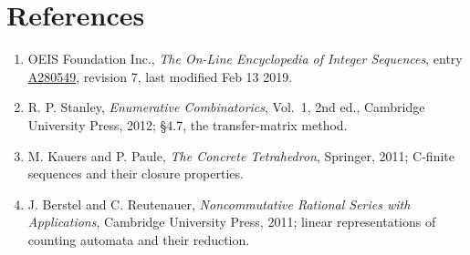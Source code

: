 \documentclass[11pt]{article}
\theoremstyle{definition}
\begin{document}
\section{References}

\begin{enumerate}

\item OEIS Foundation Inc., \emph{The On-Line Encyclopedia of Integer Sequences}, entry \href{https://oeis.org/A280549}{A280549}, revision 7, last modified Feb 13 2019.

\item R. P. Stanley, \emph{Enumerative Combinatorics}, Vol.~1, 2nd ed., Cambridge University Press, 2012; \S4.7, the transfer-matrix method.

\item M. Kauers and P. Paule, \emph{The Concrete Tetrahedron}, Springer, 2011; C-finite sequences and their closure properties.

\item J. Berstel and C. Reutenauer, \emph{Noncommutative Rational Series with Applications}, Cambridge University Press, 2011; linear representations of counting automata and their reduction.

\end{enumerate}
\end{document}
